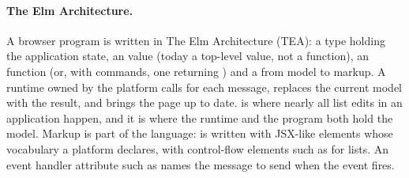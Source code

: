 \paragraph{The Elm Architecture.} A browser program is written in The Elm Architecture (TEA): a
 type holding the application state, an  value (today a top-level value, not
a function), an
 function (or, with commands, one returning
) and a  from model to markup. A runtime owned by the platform
calls  for each message, replaces the current model with the result, and brings the
page up to date.  is where nearly all list edits in an application happen, and it is
where the runtime and the program both hold the model. Markup is part of the language: 
is written with JSX-like elements whose vocabulary a platform declares, with control-flow elements
such as  for lists. An event handler attribute such as
 names the message to send when the event fires.

